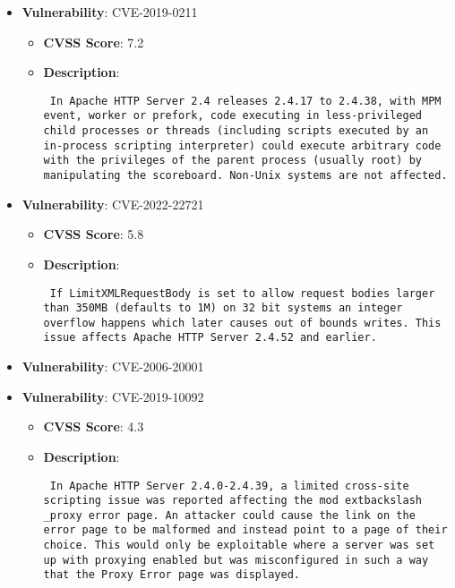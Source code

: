 \documentclass{article}
\begin{document}
\begin{itemize}
        \item \textbf{Vulnerability}: CVE-2019-0211
        \begin{itemize}
            \item \textbf{CVSS Score}:  7.2 
            \item \textbf{Description}: \parbox{\linewidth}{\texttt{ In Apache HTTP Server 2.4 releases 2.4.17 to 2.4.38, with MPM event, worker or prefork, code executing in less-privileged child processes or threads (including scripts executed by an in-process scripting interpreter) could execute arbitrary code with the privileges of the parent process (usually root) by manipulating the scoreboard. Non-Unix systems are not affected. }}
        \end{itemize}
    
        \item \textbf{Vulnerability}: CVE-2022-22721
        \begin{itemize}
            \item \textbf{CVSS Score}:  5.8 
            \item \textbf{Description}: \parbox{\linewidth}{\texttt{ If LimitXMLRequestBody is set to allow request bodies larger than 350MB (defaults to 1M) on 32 bit systems an integer overflow happens which later causes out of bounds writes. This issue affects Apache HTTP Server 2.4.52 and earlier. }}
        \end{itemize}
    
        \item \textbf{Vulnerability}: CVE-2006-20001
    
        \item \textbf{Vulnerability}: CVE-2019-10092
        \begin{itemize}
            \item \textbf{CVSS Score}:  4.3 
            \item \textbf{Description}: \parbox{\linewidth}{\texttt{ In Apache HTTP Server 2.4.0-2.4.39, a limited cross-site scripting issue was reported affecting the mod	extbackslash _proxy error page. An attacker could cause the link on the error page to be malformed and instead point to a page of their choice. This would only be exploitable where a server was set up with proxying enabled but was misconfigured in such a way that the Proxy Error page was displayed. }}
        \end{itemize}
    

\end{itemize}
\end{document}
